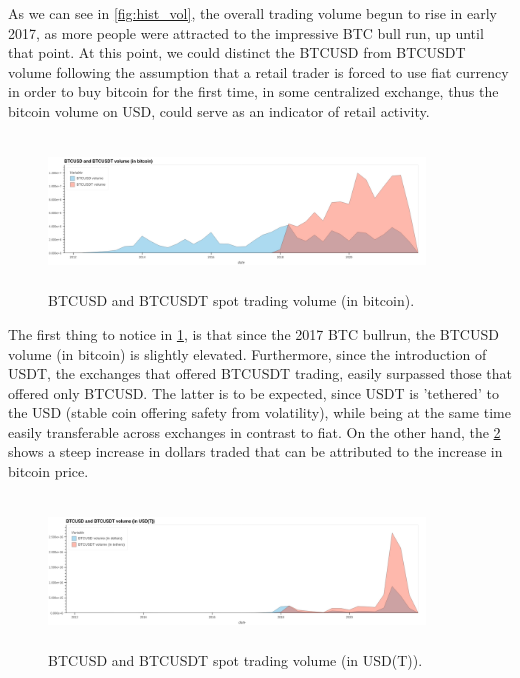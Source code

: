 \documentclass[10pt]{asme2ej}
\begin{document}
As we can see in \ref{fig:hist_vol}, the overall trading volume begun to rise in early 2017, as more people were attracted to the impressive BTC bull run, up until that point. At this point, we could distinct the BTCUSD from BTCUSDT volume following the assumption that a retail trader is forced to use fiat currency in order to buy bitcoin for the first time, in some centralized exchange, thus the bitcoin volume on USD, could serve as an indicator of retail activity.


\begin{figure}[H]
	\centering
	\includegraphics[width=10cm, height = 4cm]{volume2.png}
	\caption{BTCUSD and BTCUSDT spot trading volume (in bitcoin).}
	\label{fig:vol2}
\end{figure}

The first thing to notice in \ref{fig:vol2}, is that since the 2017 BTC bullrun, the BTCUSD volume (in bitcoin) is slightly elevated. Furthermore, since the introduction of USDT, the exchanges that offered BTCUSDT trading, easily surpassed those that offered only BTCUSD. The latter is to be expected, since USDT is 'tethered' to the USD (stable coin offering safety from volatility), while being at the same time easily transferable across exchanges in contrast to fiat. On the other hand, the \ref{fig:vol3} shows a steep increase in dollars traded that can be attributed to the increase in bitcoin price. 

\begin{figure}[H]
	\centering
	\includegraphics[width=10cm, height = 4cm]{usdusdt.png}
	\caption{BTCUSD and BTCUSDT spot trading volume (in USD(T)).}
	\label{fig:vol3}
\end{figure}
\end{document}
